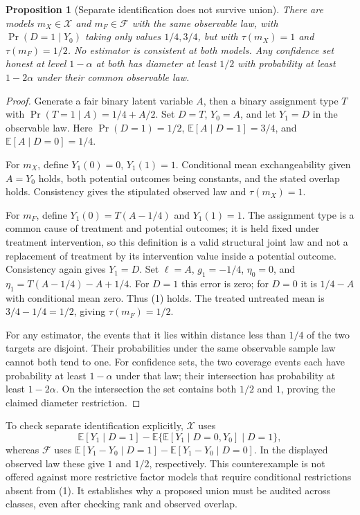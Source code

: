 \documentclass[11pt]{article}
\newtheorem{proposition}[theorem]{Proposition}
\theoremstyle{remark}
\newcommand{\E}{\mathbb E}
\begin{document}
\begin{proposition}[Separate identification does not survive union]
There are models $m_X\in\mathcal X$ and $m_F\in\mathcal F$ with the same
observable law, with $\Pr(D=1\mid Y_0)$ taking only values $1/4,3/4$,
but with $\tau(m_X)=1$ and $\tau(m_F)=1/2$. No estimator is consistent
at both models. Any confidence set honest at level $1-\alpha$ at both
has diameter at least $1/2$ with probability at least $1-2\alpha$
under their common observable law.
\end{proposition}
\begin{proof}
Generate a fair binary latent variable $A$, then a binary assignment type
$T$ with $\Pr(T=1\mid A)=1/4+A/2$. Set $D=T$, $Y_0=A$, and let
$Y_1=D$ in the observable law. Here $\Pr(D=1)=1/2$,
$\E[A\mid D=1]=3/4$, and $\E[A\mid D=0]=1/4$.

For $m_X$, define $Y_1(0)=0$, $Y_1(1)=1$. Conditional mean exchangeability
given $A=Y_0$ holds, both potential outcomes being constants, and the
stated overlap holds. Consistency gives the stipulated observed law and
$\tau(m_X)=1$.

For $m_F$, define $Y_1(0)=T(A-1/4)$ and $Y_1(1)=1$.
The assignment type is a common cause of treatment and potential outcomes;
it is held fixed under treatment intervention, so this definition is a
valid structural joint law and not a replacement of treatment by its
intervention value inside a potential outcome. Consistency again gives
$Y_1=D$. Set $\ell=A$, $g_1=-1/4$, $\eta_0=0$, and
$\eta_1=T(A-1/4)-A+1/4$. For $D=1$ this error is zero; for $D=0$ it is
$1/4-A$ with conditional mean zero. Thus (1) holds. The treated untreated
mean is $3/4-1/4=1/2$, giving $\tau(m_F)=1/2$.

For any estimator, the events that it lies within distance less than $1/4$
of the two targets are disjoint. Their probabilities under the same
observable sample law cannot both tend to one. For confidence sets,
the two coverage events each have probability at least $1-\alpha$
under that law; their intersection has probability at least $1-2\alpha$.
On the intersection the set contains both $1/2$ and $1$, proving the
claimed diameter restriction.
\end{proof}

To check separate identification explicitly, $\mathcal X$ uses
\[
 \E[Y_1\mid D=1]-
 \E\{\E[Y_1\mid D=0,Y_0]\mid D=1\},
\]
whereas $\mathcal F$ uses
$\E[Y_1-Y_0\mid D=1]-\E[Y_1-Y_0\mid D=0]$.
In the displayed observed law these give $1$ and $1/2$, respectively.
This counterexample is not offered against more restrictive factor models
that require conditional restrictions absent from (1). It establishes
why a proposed union must be audited across classes, even after checking
rank and observed overlap.
\end{document}
